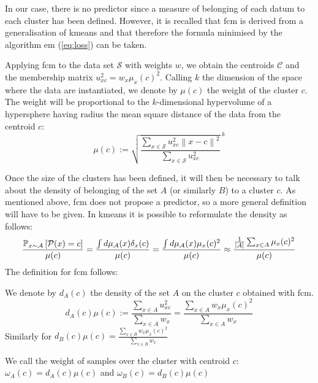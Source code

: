 \noindent In our case, there is no predictor since a measure of belonging of each datum to each cluster has been defined. However, it is recalled that \gls{fcm} is derived from a generalisation of \gls{kmeans} and that therefore the formula minimised by the algorithm \gls{em} (\cref{eq:loss}) can be taken.
\begin{definition}
\label{def:cluster_measure}
	Applying \gls{fcm} to the data set $\mathcal{S}$ with weights $w$, we obtain the centroids $\mathcal{C}$ and the membership matrix $u_{xc}^2=w_x\mu_x(c)^2$. Calling $k$ the dimension of the space where the data are instantiated, we denote by $\mu(c)$ the weight of the cluster $c$. The weight will be proportional to the $k$-dimensional hypervolume of a hypersphere having radius the mean square distance of the data from the centroid $c$:
	\begin{equation}
		\mu(c) := {\sqrt{\frac{\sum_{x\in\mathcal{S}} u_{xc}^2 \left\|x-c\right\|^2}{\sum_{x\in\mathcal{S}}u_{xc}^2}}\,}^k
		\label{eq:fcm_cluster_measure}
	\end{equation}
\end{definition}

\noindent Once the size of the clusters has been defined, it will then be necessary to talk about the density of belonging of the set $A$ (or similarly $B$) to a cluster $c$. As mentioned above, \gls{fcm} does not propose a predictor, so a more general definition will have to be given. In \gls{kmeans} it is possible to reformulate the density as follows:
\begin{equation*}
	\frac{\mathbb{P}_{x\sim\mathcal{A}}\left[\mathcal{P}(x)=c\right]}{\mu(c)} = \frac{\int d\mu_\mathcal{A}(x) \delta_x(c)}{\mu(c)} = \frac{\int d\mu_\mathcal{A}(x) \mu_x(c)^2}{\mu(c)} \approx \frac{\frac{1}{|A|}\sum_{x\in A} \mu_x(c)^2}{\mu(c)}\\
\end{equation*}
The definition for \gls{fcm} follows:
\begin{definition}
\label{def:weightovercluster}
	We denote by $d_A(c)$ the density of the set $A$ on the cluster $c$ obtained with \gls{fcm}.
	\begin{equation}
		d_A(c)\mu(c) := \frac{\sum_{x\in A} u_{xc}^2}{\sum_{x\in A}w_x} = \frac{\sum_{x\in A} w_x\mu_x(c)^2}{\sum_{x\in A}w_x}
	\end{equation}
	Similarly for $d_B(c)\mu(c) = \frac{\sum_{x\in B} w_x\mu_x(c)^2}{\sum_{x\in B}w_x}$

	\noindent We call the weight of samples over the cluster with centroid $c$:\\ $\omega_A(c)=d_A(c)\mu(c)$ and $\omega_B(c)=d_B(c)\mu(c)$
\end{definition}

